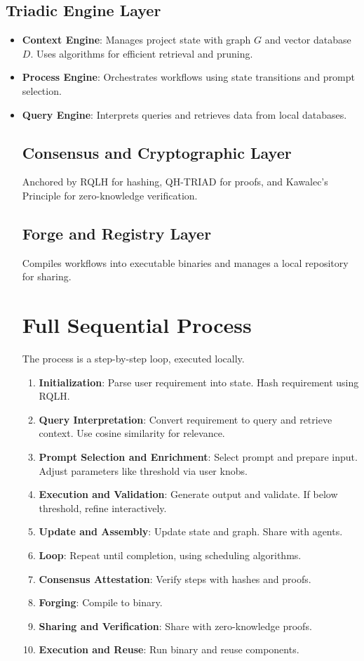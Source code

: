 \documentclass{article}
\theoremstyle{definition}
\begin{document}
\subsection{Triadic Engine Layer}
\begin{itemize}[leftmargin=1.5em]
  \item \textbf{Context Engine}: Manages project state with graph $G$ and vector database $D$. Uses algorithms for efficient retrieval and pruning.
  \item \textbf{Process Engine}: Orchestrates workflows using state transitions and prompt selection.
  \item \textbf{Query Engine}: Interprets queries and retrieves data from local databases.

\subsection{Consensus and Cryptographic Layer}
Anchored by RQLH for hashing, QH-TRIAD for proofs, and Kawalec’s Principle for zero-knowledge verification.

\subsection{Forge and Registry Layer}
Compiles workflows into executable binaries and manages a local repository for sharing.

\section{Full Sequential Process}

The process is a step-by-step loop, executed locally.

\begin{enumerate}[leftmargin=1.5em]
\item \textbf{Initialization}: Parse user requirement into state. Hash requirement using RQLH.
\item \textbf{Query Interpretation}: Convert requirement to query and retrieve context. Use cosine similarity for relevance.
\item \textbf{Prompt Selection and Enrichment}: Select prompt and prepare input. Adjust parameters like threshold via user knobs.
\item \textbf{Execution and Validation}: Generate output and validate. If below threshold, refine interactively.
\item \textbf{Update and Assembly}: Update state and graph. Share with agents.
\item \textbf{Loop}: Repeat until completion, using scheduling algorithms.
\item \textbf{Consensus Attestation}: Verify steps with hashes and proofs.
\item \textbf{Forging}: Compile to binary.
\item \textbf{Sharing and Verification}: Share with zero-knowledge proofs.
\item \textbf{Execution and Reuse}: Run binary and reuse components.
\end{enumerate}


\end{itemize}
\end{document}
